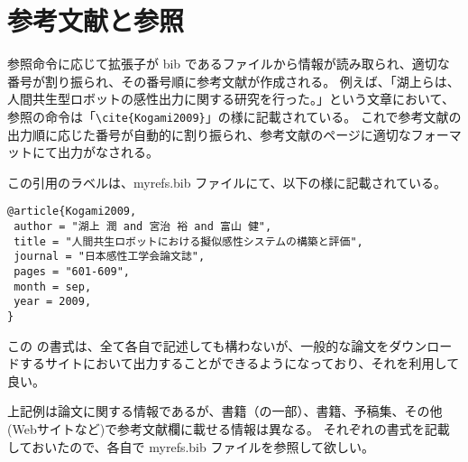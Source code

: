 \section{参考文献と参照}
参照命令に応じて拡張子が bib であるファイルから情報が読み取られ、適切な番号が割り振られ、その番号順に参考文献が作成される。
例えば、「湖上ら\cite{Kogami2009}は、人間共生型ロボットの感性出力に関する研究を行った。」という文章において、参照の命令は「\verb+\cite{Kogami2009}+」の様に記載されている。
これで参考文献の出力順に応じた番号が自動的に割り振られ、参考文献のページに適切なフォーマットにて出力がなされる。

この引用のラベルは、myrefs.bib ファイルにて、以下の様に記載されている。
\begin{breakbox}
{\small
\begin{verbatim}
@article{Kogami2009,
 author = "湖上 潤 and 宮治 裕 and 富山 健",
 title = "人間共生ロボットにおける擬似感性システムの構築と評価",
 journal = "日本感性工学会論文誌",
 pages = "601-609",
 month = sep,
 year = 2009,
}
\end{verbatim}
}
\end{breakbox}
この \BibTeX の書式は、全て各自で記述しても構わないが、一般的な論文をダウンロードするサイトにおいて出力することができるようになっており、それを利用して良い。

上記例は論文に関する情報であるが、書籍（の一部）\cite{WelfareJapan}、書籍\cite{Nakata2010}、予稿集\cite{Miyaji2003ROMAN}、その他(Webサイトなど)\cite{HTUlatex}で参考文献欄に載せる情報は異なる。
それぞれの書式を記載しておいたので、各自で myrefs.bib ファイルを参照して欲しい。
